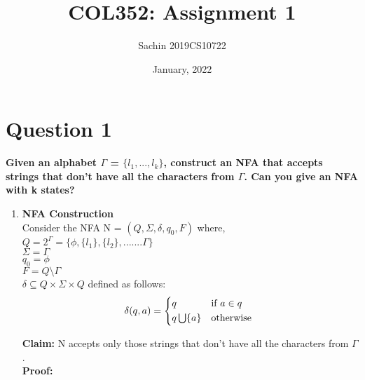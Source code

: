 \documentclass{article}
\title{COL352: Assignment 1}
\author{Sachin 2019CS10722 }
\date{January, 2022}
\begin{document}
\maketitle

\section{Question 1}

\textbf{Given an alphabet $\Gamma $ = $\{l_1,...,l_k\}$, construct an NFA that accepts strings that don't have
all the characters from $\Gamma $. Can you give an NFA with k states?}\\

\begin{enumerate}
    \item \textbf{NFA Construction}\\
Consider the NFA N = {$(Q, \Sigma, \delta, q_0 , F )$} where,\\
$Q = 2^\Gamma = \{\phi, \{l_1\}, \{l_2\}, ....... \Gamma\}$\\
$\Sigma = \Gamma$\\
$q_0 = \phi$\\
$F = Q \setminus  \Gamma$\\
$\delta \subseteq Q \times \Sigma \times Q$ defined as follows:\\

\begin{equation}
    \delta (q,a) = 
    \begin{cases*}
      q & if $a \in q$ \\
      q \bigcup \{a\}        & otherwise
    \end{cases*}
\end{equation}

\textbf{Claim: } N accepts only those strings that don't have all the characters from $\Gamma $.\\

\textbf{Proof: } \\


\end{enumerate}
\end{document}
